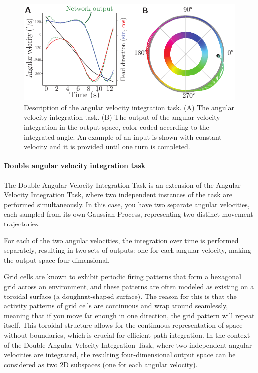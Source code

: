 \documentclass{article} %
\newcounter{ct}
\theoremstyle{definition}
\theoremstyle{remark}
\begin{document}
 \begin{figure}[tbhp]
     \centering
    \includegraphics[width=\textwidth]{task_fig}
       \caption{Description of the angular velocity integration task.
        (A) The angular velocity integration task.
        (B) The output of the angular velocity integration in the output space, color coded according to the integrated angle. An example of an input is shown with constant velocity and it is provided until one turn is completed.
        }\label{fig:angular_task}
\end{figure}

\paragraph{Double angular velocity integration task}
The Double Angular Velocity Integration Task is an extension of the Angular Velocity Integration Task, where two independent instances of the task are performed simultaneously. In this case, you have two separate angular velocities, each sampled from its own Gaussian Process, representing two distinct movement trajectories.

For each of the two angular velocities, the integration over time is performed separately, resulting in two sets of outputs: one for each angular velocity, making the output space four dimensional.

Grid cells are known to exhibit periodic firing patterns that form a hexagonal grid across an environment, and these patterns are often modeled as existing on a toroidal surface (a doughnut-shaped surface)\citep{hermansen2024uncovering}. The reason for this is that the activity patterns of grid cells are continuous and wrap around seamlessly, meaning that if you move far enough in one direction, the grid pattern will repeat itself. This toroidal structure allows for the continuous representation of space without boundaries, which is crucial for efficient path integration.
In the context of the Double Angular Velocity Integration Task, where two independent angular velocities are integrated, the resulting four-dimensional output space can be considered as two 2D subspaces (one for each angular velocity).
\end{document}

